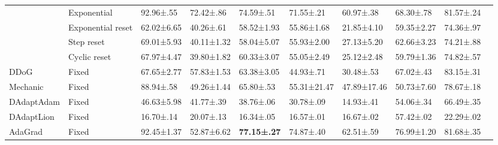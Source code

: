 \begin{tabular}{llllllllll}
                             & Exponential       & 92.96±.55           & 72.42±.86           & 74.59±.51           & 71.55±.21           & 60.97±.38           & 68.30±.78           & 81.57±.24           \\
                             & Exponential reset & 62.02±6.65          & 40.26±.61           & 58.52±1.93          & 55.86±1.68          & 21.85±4.10          & 59.35±2.27          & 74.36±.97           \\
                             & Step reset        & 69.01±5.93          & 40.11±1.32          & 58.04±5.07          & 55.93±2.00          & 27.13±5.20          & 62.66±3.23          & 74.21±.88           \\
                             & Cyclic reset      & 67.97±4.47          & 39.80±1.82          & 60.33±3.07          & 55.05±2.49          & 25.12±2.48          & 59.79±1.36          & 74.82±.57           \\
    DDoG                     & Fixed             & 67.65±2.77          & 57.83±1.53          & 63.38±3.05          & 44.93±.71           & 30.48±.53           & 67.02±.43           & 83.15±.31           \\
    Mechanic                 & Fixed             & 88.94±.58           & 49.26±1.44          & 65.80±.53           & 55.31±21.47         & 47.89±17.46         & 50.73±7.60          & 78.67±.18           \\
    DAdaptAdam               & Fixed             & 46.63±5.98          & 41.77±.39           & 38.76±.06           & 30.78±.09           & 14.93±.41           & 54.06±.34           & 66.49±.35           \\
    DAdaptLion               & Fixed             & 16.70±.14           & 20.07±.13           & 16.34±.05           & 16.57±.01           & 16.67±.02           & 57.42±.02           & 22.29±.02           \\
    AdaGrad                  & Fixed             & 92.45±1.37          & 52.87±6.62          & \bfseries 77.15±.27 & 74.87±.40           & 62.51±.59           & 76.99±1.20          & 81.68±.35           \\
    \bottomrule
\end{tabular}

